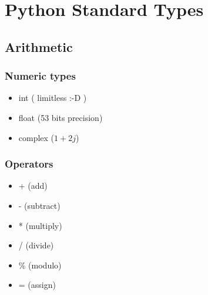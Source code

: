 \documentclass{beamer}
\begin{document}
\section{Python Standard Types}
\subsection{Arithmetic}

\begin{frame}
    \frametitle{Numeric types}
    \begin{itemize}
        \item<1-> int ( limitless :-D )
        \item<2-> float (53 bits precision)
        \item<3-> complex ($1+2j$)
    \end{itemize}
\end{frame}

\begin{frame}
    \frametitle{Operators}
    \begin{itemize}
        \item<1-> + (add)
        \item<2-> - (subtract)
        \item<3-> * (multiply)
        \item<4-> / (divide)
        \item<5-> \% (modulo)
        \item<6-> =	(assign)
    \end{itemize}
\end{frame}


\end{document}
